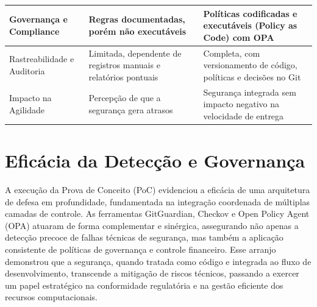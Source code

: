\begin{table}[ht]
\begin{tabular}{|p{4cm}|p{5.5cm}|p{5.5cm}|}
Governança e Compliance &
Regras documentadas, porém não executáveis &
Políticas codificadas e executáveis (Policy as Code) com OPA \\
\hline

Rastreabilidade e Auditoria &
Limitada, dependente de registros manuais e relatórios pontuais &
Completa, com versionamento de código, políticas e decisões no Git \\
\hline

Impacto na Agilidade &
Percepção de que a segurança gera atrasos &
Segurança integrada sem impacto negativo na velocidade de entrega \\
\hline
\end{tabular}
\end{table}

\section{Eficácia da Detecção e Governança}
A execução da Prova de Conceito (PoC) evidenciou a eficácia de uma arquitetura de defesa em profundidade, fundamentada na integração coordenada de múltiplas camadas de controle. As ferramentas GitGuardian, Checkov e Open Policy Agent (OPA) atuaram de forma complementar e sinérgica, assegurando não apenas a detecção precoce de falhas técnicas de segurança, mas também a aplicação consistente de políticas de governança e controle financeiro. Esse arranjo demonstrou que a segurança, quando tratada como código e integrada ao fluxo de desenvolvimento, transcende a mitigação de riscos técnicos, passando a exercer um papel estratégico na conformidade regulatória e na gestão eficiente dos recursos computacionais.

